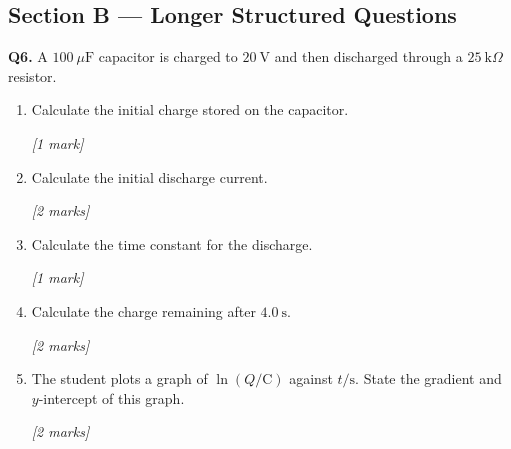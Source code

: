 \pagebreak

\subsection*{Section B — Longer Structured Questions}

\begin{tcolorbox}[colback=white, colframe=midblue, breakable]

\begin{minipage}{\linewidth}
\textbf{Q6.} A $100\ \mu\text{F}$ capacitor is charged to $20\ \text{V}$ and then discharged through a $25\ \text{k}\Omega$ resistor.
\end{minipage}

\begin{enumerate}[label=(\alph*)]
  \item \begin{minipage}[t]{\linewidth}
  Calculate the initial charge stored on the capacitor.
  \par\hfill\textit{[1 mark]}
  \vspace{2cm}
  \end{minipage}

  \item \begin{minipage}[t]{\linewidth}
  Calculate the initial discharge current.
  \par\hfill\textit{[2 marks]}
  \vspace{2.5cm}
  \end{minipage}

  \item \begin{minipage}[t]{\linewidth}
  Calculate the time constant for the discharge.
  \par\hfill\textit{[1 mark]}
  \vspace{2cm}
  \end{minipage}

  \item \begin{minipage}[t]{\linewidth}
  Calculate the charge remaining after $4.0\ \text{s}$.
  \par\hfill\textit{[2 marks]}
  \vspace{3cm}
  \end{minipage}

  \item \begin{minipage}[t]{\linewidth}
  The student plots a graph of $\ln(Q/\text{C})$ against $t/\text{s}$. State the gradient and $y$-intercept of this graph.
  \par\hfill\textit{[2 marks]}
  \vspace{3cm}
  \end{minipage}
\end{enumerate}


\end{tcolorbox}
